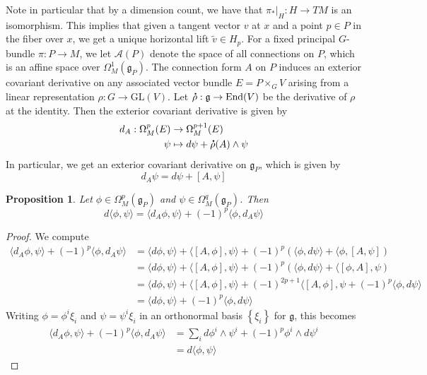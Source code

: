 \documentclass[psamsfonts, 12pt]{amsart}
\newtheorem{prop}[thm]{Proposition}
\theoremstyle{definition}
\theoremstyle{remark}
\newcommand{\GL}{\mathrm{GL}}
\newcommand{\g}{\mathfrak{g}}
\newcommand*{\dt}[1]{%
   \accentset{\mbox{\large\bfseries .}}{#1}}
\newcommand{\set}[1]{\left\lbrace #1 \right\rbrace}
\DeclareMathOperator{\End}{End}
\begin{document}
%
Note in particular that by a dimension count, we have that $\pi_*\vert_H : H \to TM$ is
an isomorphism. This implies that given a tangent vector $v$ at $x$ and a point
$p \in P$ in the fiber over $x$, we get a unique horizontal lift
$\tilde{v} \in H_p$. For a fixed principal $G$-bundle $\pi : P \to M$, we let
$\mathscr{A}(P)$ denote the space of all connections on $P$, which is an affine space
over $\Omega^1_M(\g_P)$. The connection form $A$ on $P$ induces an exterior covariant
derivative on any associated vector bundle $E = P \times_G V$ arising from a linear
representation $\rho : G \to \GL(V)$. Let $\dt{\rho} : \g \to \End(V)$ be the
derivative of $\rho$ at the identity. Then the exterior covariant derivative is given
by
\begin{align*}
d_A : \Omega^p_M(E) &\to \Omega^{p+1}_M(E) \\
\psi &\mapsto d\psi + \dt{\rho}(A) \wedge \psi
\end{align*}
%
In particular, we get an exterior covariant derivative on $\g_P$, which is given by
\[
d_A\psi = d\psi + [A,\psi]
\]
\begin{prop}
Let $\phi \in \Omega^p_M(\g_P)$ and $\psi \in \Omega^q_M(\g_P)$. Then
\[
d\langle\phi,\psi\rangle = \langle d_A\phi,\psi\rangle
+ (-1)^p\langle \phi,d_A\psi\rangle
\]
\end{prop}
%
\begin{proof}
We compute
\begin{align*}
\langle d_A\phi,\psi\rangle + (-1)^p\langle\phi,d_A\psi\rangle
&= \langle d\phi,\psi\rangle + \langle[A,\phi],\psi\rangle
+ (-1)^p (\langle \phi,d\psi\rangle + \langle \phi,[A,\psi]) \\
&= \langle d\phi,\psi\rangle + \langle[A,\phi],\psi\rangle
+ (-1)^p (\langle\phi,d\psi\rangle + \langle[\phi,A],\psi) \\
&= \langle d\phi,\psi\rangle + \langle [A,\phi],\psi\rangle
+ (-1)^{2p+1}\langle [A,\phi],\psi + (-1)^p\langle\phi,d\psi\rangle \\
&= \langle d\phi,\psi\rangle + (-1)^p\langle\phi,d\psi\rangle
\end{align*}
Writing $\phi = \phi^i\xi_i$ and $\psi=\psi^i\xi_i$ in an orthonormal basis
$\set{\xi_i}$ for $\g$, this becomes
\begin{align*}
\langle d_A\phi,\psi\rangle + (-1)^p\langle\phi,d_A\psi\rangle
&= \sum_i d\phi^i \wedge \psi^i + (-1)^p \phi^i\wedge d\psi^i \\
&= d\langle\phi,\psi\rangle
\end{align*}
\end{proof}
\end{document}
